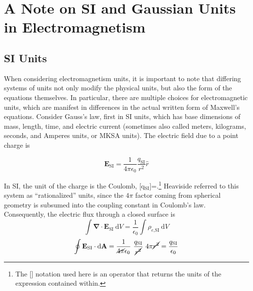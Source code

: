 \documentclass[notoc]{tufte-handout}
\renewcommand{\vec}[1]{\mathbf{#1}}
\newcommand{\del}{\vec{\nabla}}
\begin{document}
\vfill\eject




\appendix

\section  {A Note on SI and Gaussian  Units in Electromagnetism}

\subsection {SI Units}

When considering electromagnetism units, it is important to note that differing systems of units not only modify the physical units, but also the form of the equations themselves. In particular, there are multiple choices for electromagnetic units,  which are  manifest in  differences in the actual written form of Maxwell's equations. Consider Gauss's law, first in SI units, which has base dimensions of mass, length, time, and electric current (sometimes also called meters, kilograms, seconds, and Amperes units, or MKSA units).  The electric field due to a point charge is


\begin{equation}
\vec{E}_{\text{SI}} = \frac{1}{4\pi \epsilon_0} \frac{q_{\text{SI} } } {r^2}   \hat{r}
\end{equation}

In SI, the unit of the charge is the Coulomb, [q$_{\text{SI} }$]=.\footnote {The [] notation used here is an operator that returns the units of the expression contained within.} Heaviside referred to this system as ``rationalized'' units, since the $4\pi$ factor coming from spherical geometry is subsumed into the coupling constant in Coulomb's law. Consequently, the electric flux through a closed surface is
\begin{equation}
\int \del \cdot \vec{E}_{\text{SI}}~\mathrm{d}V = \frac{1}{\epsilon_0} \int \rho_{e\text{,SI}}~\mathrm{d}V
\end{equation}
\begin{equation}
\oint \vec{E}_{\text{SI}}\cdot \mathrm{d}\vec{A} = \frac{1}{\cancel{4\pi}\epsilon_0}~\frac{q_{\text{SI}}}{\cancel{r^2}}~ 4\pi \cancel{r^2}  = \frac{q_{\text{SI}}}{\epsilon_0}
\end{equation}

\end{document}
